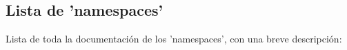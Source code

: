 \subsection{Lista de 'namespaces'}
Lista de toda la documentación de los 'namespaces', con una breve descripción\-:\begin{DoxyCompactList}
\item{}
\end{DoxyCompactList}

